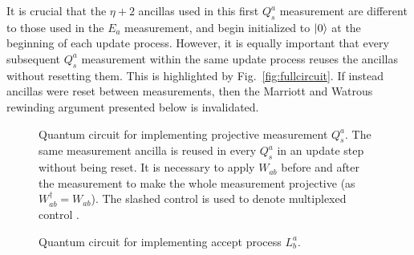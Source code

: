 \documentclass[aps,floatfix,10pt,amssymb,amsfont,amsmath,superscriptaddress,float,nofootinbib,longbibliography,nobalancelastpage,twocolumn]{revtex4-2}
\begin{document}
It is crucial that the $\eta+2$ ancillas used in this first $Q^a_s$ measurement are different to those used in the $E_a$ measurement, and begin initialized to $\ket{0}$ at the beginning of each update process. However, it is equally important that every subsequent $Q_s^a$ measurement within the same update process reuses the ancillas without resetting them. This is highlighted by Fig.~\ref{fig:fullcircuit}. If instead ancillas were reset between measurements, then the Marriott and Watrous rewinding argument presented below is invalidated.
\begin{figure}

\caption{Quantum circuit for implementing projective measurement $Q_s^a$. The same measurement ancilla is reused in every $Q_s^a$ in an update step without being reset. It is necessary to apply $W_{ab}$ before and after the measurement to make the whole measurement projective (as $W_{ab}^{\dagger} = W_{ab}$). The slashed control is used to denote multiplexed control \cite{low2024trading}.}
\label{fig:Qcircuit}
\end{figure}

\begin{figure}

\caption{Quantum circuit for implementing accept process $L_b^a$.}
\label{fig:LQ_circuit}
\end{figure}
\end{document}
